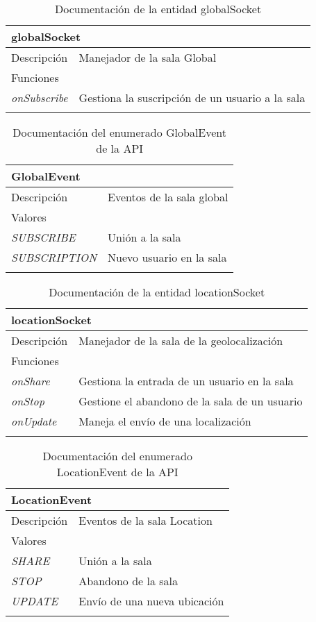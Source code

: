 \begin{longtable}{|p{} p{}|}
    \hline
    \multicolumn{2}{|l|}{\textbf{globalSocket}} \\ \hline \hline
    Descripción      & Manejador de la sala Global \\ \hline
    \multicolumn{2}{|l|}{Funciones} \\
    \emph{onSubscribe}  & Gestiona la suscripción de un usuario a la sala \\ \hline
    \caption{Documentación de la entidad globalSocket}
    \label{dis:api:global_socket}
\end{longtable}

\begin{longtable}{|p{} p{}|}
    \hline
    \multicolumn{2}{|l|}{\textbf{GlobalEvent}} \\ \hline \hline
    Descripción      & Eventos de la sala global \\ \hline
    \multicolumn{2}{|l|}{Valores} \\
    \emph{SUBSCRIBE}  & Unión a la sala  \\
    \emph{SUBSCRIPTION} & Nuevo usuario en la sala  \\ \hline
    \caption{Documentación del enumerado GlobalEvent de la API}
    \label{dis:api:global_event}
\end{longtable}

\hspace{\textwidth}
\begin{longtable}{|p{} p{}|}
    \hline
    \multicolumn{2}{|l|}{\textbf{locationSocket}} \\ \hline \hline
    Descripción      & Manejador de la sala de la geolocalización \\ \hline
    \multicolumn{2}{|l|}{Funciones} \\
    \emph{onShare}  & Gestiona la entrada de un usuario en la sala  \\
    \emph{onStop}  & Gestione el abandono de la sala de un usuario  \\
    \emph{onUpdate}  & Maneja el envío de una localización  \\ \hline
    \caption{Documentación de la entidad locationSocket}
    \label{dis:api:location_socket}
\end{longtable}

\vspace{-15pt}
\begin{longtable}{|p{} p{}|}
    \hline
    \multicolumn{2}{|l|}{\textbf{LocationEvent}} \\ \hline \hline
    Descripción      & Eventos de la sala Location \\ \hline
    \multicolumn{2}{|l|}{Valores} \\
    \emph{SHARE}  & Unión a la sala  \\
    \emph{STOP} & Abandono de la sala  \\
    \emph{UPDATE} & Envío de una nueva ubicación  \\ \hline
    \caption{Documentación del enumerado LocationEvent de la API}
    \label{dis:api:location_event}
\end{longtable}

